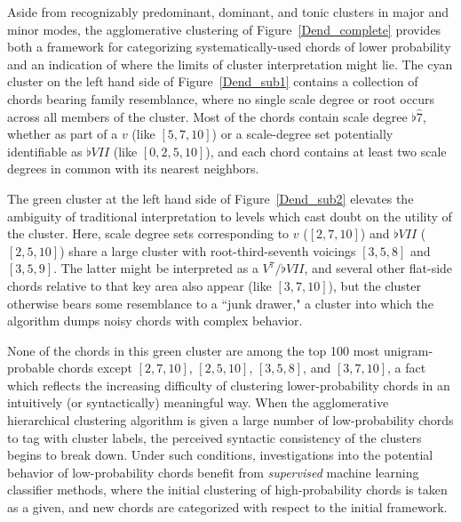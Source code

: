 Aside from recognizably predominant, dominant, and tonic clusters in major and minor modes, the agglomerative clustering of Figure~\ref{Dend_complete} provides both a framework for categorizing systematically-used chords of lower probability and an indication of where the limits of cluster interpretation might lie.  The cyan cluster on the left hand side of Figure~\ref{Dend_sub1} contains a collection of chords bearing family resemblance, where no single scale degree or root occurs across all members of the cluster.  Most of the chords contain scale degree $\flat\hat{7}$, whether as part of a $v$ (like $[5,7,10]$) or a scale-degree set potentially identifiable as $\flat VII$ (like $[0,2,5,10]$), and each chord contains at least two scale degrees in common with its nearest neighbors.

The green cluster at the left hand side of Figure~\ref{Dend_sub2} elevates the ambiguity of traditional interpretation to levels which cast doubt on the utility of the cluster.  Here, scale degree sets corresponding to $v$ ($[2,7,10]$) and $\flat VII$ ($[2,5,10]$) share a large cluster with root-third-seventh voicings $[3,5,8]$ and $[3,5,9]$.  The latter might be interpreted as a $V^7 / \flat VII$, and several other flat-side chords relative to that key area also appear (like $[3,7,10]$), but the cluster otherwise bears some resemblance to a ``junk drawer," a cluster into which the algorithm dumps noisy chords with complex behavior.

None of the chords in this green cluster are among the top 100 most unigram-probable chords except $[2,7,10]$, $[2,5,10]$, $[3,5,8]$, and $[3,7,10]$, a fact which reflects the increasing difficulty of clustering lower-probability chords in an intuitively (or syntactically) meaningful way.  When the agglomerative hierarchical clustering algorithm is given a large number of low-probability chords to tag with cluster labels, the perceived syntactic consistency of the clusters begins to break down.  Under such conditions, investigations into the potential behavior of low-probability chords benefit from \emph{supervised} machine learning classifier methods, where the initial clustering of high-probability chords is taken as a given, and new chords are categorized with respect to the initial framework. 

